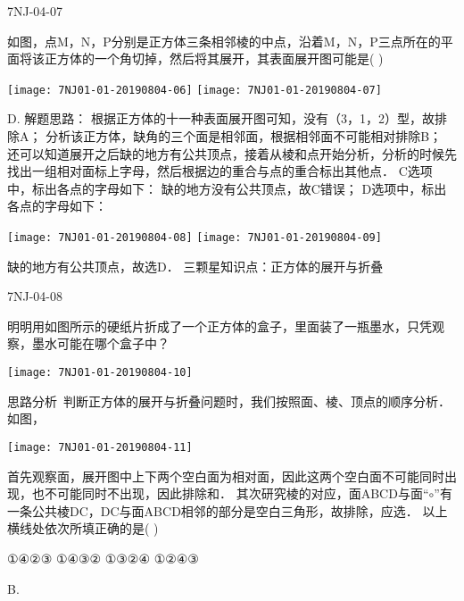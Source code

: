 \begin{defproblem}{7NJ-04-07}%
\begin{onlyproblem}%
如图，点M，N，P分别是正方体三条相邻棱的中点，沿着M，N，P三点所在的平面将该正方体的一个角切掉，然后将其展开，其表面展开图可能是(    )  
\begin{center}
\texttt{[image: 7NJ01-01-20190804-06]}
\texttt{[image: 7NJ01-01-20190804-07]}
\end{center}


\end{onlyproblem}%
\begin{onlysolution}%
\begin{solution}%
D.
解题思路： 根据正方体的十一种表面展开图可知，没有（3，1，2）型，故排除A； 分析该正方体，缺角的三个面是相邻面，根据相邻面不可能相对排除B； 还可以知道展开之后缺的地方有公共顶点，接着从棱和点开始分析，分析的时候先找出一组相对面标上字母，然后根据边的重合与点的重合标出其他点． C选项中，标出各点的字母如下：   缺的地方没有公共顶点，故C错误； D选项中，标出各点的字母如下：
\begin{center}
\texttt{[image: 7NJ01-01-20190804-08]}
\texttt{[image: 7NJ01-01-20190804-09]}
\end{center}
 缺的地方有公共顶点，故选D． 
三颗星知识点：正方体的展开与折叠  
\end{solution}%
\end{onlysolution}%
\end{defproblem}




\begin{defproblem}{7NJ-04-08}%
\begin{onlyproblem}%
明明用如图所示的硬纸片折成了一个正方体的盒子，里面装了一瓶墨水，只凭观察，墨水可能在哪个盒子中？ 
\begin{center}
\texttt{[image: 7NJ01-01-20190804-10]}
\end{center}

思路分析~判断正方体的展开与折叠问题时，我们按照面、棱、顶点的顺序分析． 如图，
\begin{center}
\texttt{[image: 7NJ01-01-20190804-11]}
\end{center}

首先观察面，展开图中上下两个空白面为相对面，因此这两个空白面不可能同时出现，也不可能同时不出现，因此排除\underline{\hspace*{2cm}}和\underline{\hspace*{2cm}}． 其次研究棱的对应，面ABCD与面“$\circ$”有一条公共棱DC，DC与面ABCD相邻的部分是空白三角形，故排除\underline{\hspace*{2cm}}，应选\underline{\hspace*{2cm}}． 以上横线处依次所填正确的是(    ) 

\xx
{①④②③}
{①④③②}
{①③②④}
{①②④③}

\end{onlyproblem}%
\begin{onlysolution}%
\begin{solution}%
B.
\end{solution}%
\end{onlysolution}%
\end{defproblem}




